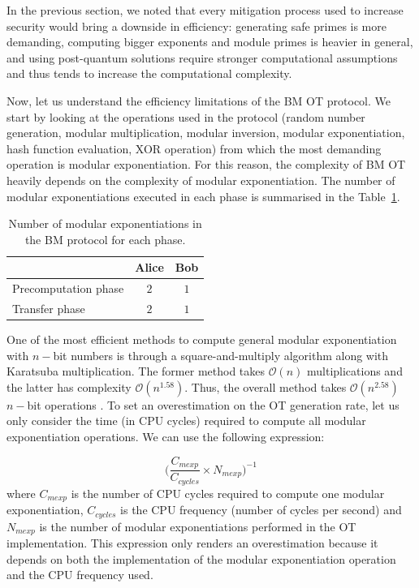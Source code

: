 In the previous section, we noted that every mitigation process used to increase security would bring a downside in efficiency: generating safe primes is more demanding, computing bigger exponents and module primes is heavier in general, and using post-quantum solutions require stronger computational assumptions and thus tends to increase the computational complexity. 

Now, let us understand the efficiency limitations of the BM OT protocol. We start by looking at the operations used in the protocol (random number generation, modular multiplication, modular inversion, modular exponentiation, hash function evaluation, XOR operation) from which the most demanding operation is modular exponentiation. For this reason, the complexity of BM OT heavily depends on the complexity of modular exponentiation. The number of modular exponentiations executed in each phase is summarised in the Table~\ref{table:BMOT_mexp}.


\begin{table}[h!]
\centering
\begin{tabular}{lcc}
\toprule
 & Alice & Bob \\
\midrule
\multicolumn{1}{l}{Precomputation phase}   & $2$  & $1$  \\
\multicolumn{1}{l}{Transfer phase} & $2$  & $1$\\
\bottomrule
\end{tabular}
\caption{Number of modular exponentiations in the BM protocol for each phase.}
\label{table:BMOT_mexp}
\end{table}

One of the most efficient methods to compute general modular exponentiation with $n-$bit numbers is through a square-and-multiply algorithm along with Karatsuba multiplication. The former method takes $\mathcal{O}(n)$ multiplications and the latter has complexity $\mathcal{O}(n^{1.58})$. Thus, the overall method takes $\mathcal{O}(n^{2.58})$ $n-$bit operations \cite{MVV01}. To set an overestimation on the OT generation rate, let us only consider the time (in CPU cycles) required to compute all modular exponentiation operations. We can use the following expression:

\begin{equation}
\label{eq:nOTs}
\Big( \frac{C_{mexp}}{C_{cycles}} \times N_{mexp} \Big)^{-1}
\end{equation}
where $C_{mexp}$ is the number of CPU cycles required to compute one modular exponentiation, $C_{cycles}$ is the CPU frequency (number of cycles per second) and $N_{mexp}$ is the number of modular exponentiations performed in the OT implementation. This expression only renders an overestimation because it depends on both the implementation of the modular exponentiation operation and the CPU frequency used. 

